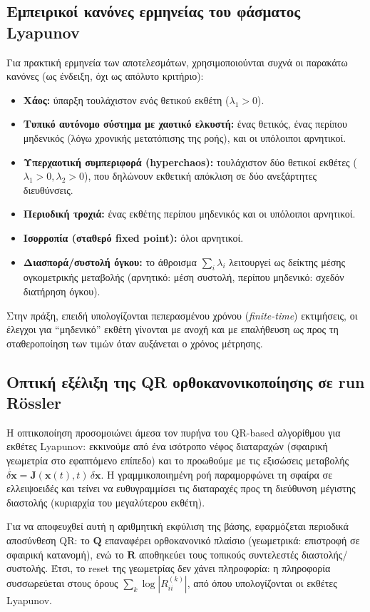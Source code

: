 \documentclass[11pt,a4paper]{report}
\begin{document}
\subsection{Εμπειρικοί κανόνες ερμηνείας του φάσματος Lyapunov}
Για πρακτική ερμηνεία των αποτελεσμάτων, χρησιμοποιούνται συχνά οι παρακάτω
κανόνες (ως ένδειξη, όχι ως απόλυτο κριτήριο):
\begin{itemize}
  \item \textbf{Χάος:} ύπαρξη τουλάχιστον ενός θετικού εκθέτη ($\lambda_1>0$).
  \item \textbf{Τυπικό αυτόνομο σύστημα με χαοτικό ελκυστή:}
  ένας θετικός, ένας περίπου μηδενικός (λόγω χρονικής μετατόπισης της ροής), και οι υπόλοιποι αρνητικοί.
  \item \textbf{Υπερχαοτική συμπεριφορά (hyperchaos):}
  τουλάχιστον δύο θετικοί εκθέτες ($\lambda_1>0,\lambda_2>0$), που δηλώνουν εκθετική απόκλιση σε δύο ανεξάρτητες διευθύνσεις.
  \item \textbf{Περιοδική τροχιά:} ένας εκθέτης περίπου μηδενικός και οι υπόλοιποι αρνητικοί.
  \item \textbf{Ισορροπία (σταθερό fixed point):} όλοι αρνητικοί.
  \item \textbf{Διασπορά/συστολή όγκου:} το άθροισμα $\sum_i\lambda_i$ λειτουργεί ως δείκτης μέσης ογκομετρικής μεταβολής
  (αρνητικό: μέση συστολή, περίπου μηδενικό: σχεδόν διατήρηση όγκου).
\end{itemize}
Στην πράξη, επειδή υπολογίζονται πεπερασμένου χρόνου (\emph{finite-time}) εκτιμήσεις, οι έλεγχοι
για ``μηδενικό'' εκθέτη γίνονται με ανοχή και με επαλήθευση ως προς τη
σταθεροποίηση των τιμών όταν αυξάνεται ο χρόνος μέτρησης.

\subsection{Οπτική εξέλιξη της QR ορθοκανονικοποίησης σε run R\"ossler}
Η οπτικοποίηση προσομοιώνει άμεσα τον πυρήνα του QR-based αλγορίθμου για εκθέτες Lyapunov:
εκκινούμε από ένα ισότροπο νέφος διαταραχών (σφαιρική γεωμετρία στο εφαπτόμενο επίπεδο)
και το προωθούμε με τις εξισώσεις μεταβολής
\(\dot{\delta\mathbf{x}}=\mathbf{J}(\mathbf{x}(t),t)\,\delta\mathbf{x}\).
Η γραμμικοποιημένη ροή παραμορφώνει τη σφαίρα σε ελλειψοειδές και τείνει να ευθυγραμμίσει
τις διαταραχές προς τη διεύθυνση μέγιστης διαστολής (κυριαρχία του μεγαλύτερου εκθέτη).

Για να αποφευχθεί αυτή η αριθμητική εκφύλιση της βάσης, εφαρμόζεται περιοδικά
αποσύνθεση QR: το \(\mathbf{Q}\) επαναφέρει ορθοκανονικό πλαίσιο (γεωμετρικά:
επιστροφή σε σφαιρική κατανομή), ενώ το \(\mathbf{R}\) αποθηκεύει τους τοπικούς
συντελεστές διαστολής/συστολής. Έτσι, το reset της γεωμετρίας δεν χάνει πληροφορία:
η πληροφορία συσσωρεύεται στους όρους \(\sum_k \log|R_{ii}^{(k)}|\), από όπου
υπολογίζονται οι εκθέτες Lyapunov.
\end{document}
